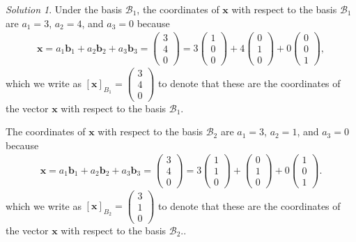 \documentclass[
]{book}
\theoremstyle{definition}
\theoremstyle{definition}
\theoremstyle{definition}
\theoremstyle{definition}
\theoremstyle{remark}
\newtheorem*{solution}{Solution}
\begin{document}
\begin{solution}

Under the basis \(\mathcal{B}_1\), the coordinates of \(\mathbf{x}\) with respect to the basis \(\mathcal{B}_1\) are \(a_1 = 3\), \(a_2 = 4\), and \(a_3 = 0\) because
\[
\begin{aligned}
\mathbf{x} = a_1 \mathbf{b}_1 + a_2 \mathbf{b}_2 + a_3 \mathbf{b}_3 =  \begin{pmatrix} 3 \\ 4 \\ 0 \end{pmatrix} = 3 \begin{pmatrix} 1 \\ 0 \\ 0 \end{pmatrix} + 4 \begin{pmatrix} 0 \\ 1 \\ 0 \end{pmatrix} + 0 \begin{pmatrix} 0 \\ 0 \\ 1 \end{pmatrix},
\end{aligned}
\]
which we write as \(\left[\mathbf{x}\right]_{B_1} = \begin{pmatrix} 3 \\ 4 \\ 0 \end{pmatrix}\) to denote that these are the coordinates of the vector \(\mathbf{x}\) with respect to the basis \(\mathcal{B}_1\).

The coordinates of \(\mathbf{x}\) with respect to the basis \(\mathcal{B}_2\) are \(a_1 = 3\), \(a_2 = 1\), and \(a_3 = 0\) because
\[
\begin{aligned}
\mathbf{x} = a_1 \mathbf{b}_1 + a_2 \mathbf{b}_2 + a_3 \mathbf{b}_3 = \begin{pmatrix} 3 \\ 4 \\ 0 \end{pmatrix} = 3 \begin{pmatrix} 1 \\ 1 \\ 0 \end{pmatrix} + \begin{pmatrix} 0 \\ 1 \\ 0 \end{pmatrix} + 0 \begin{pmatrix} 1 \\ 0 \\ 1 \end{pmatrix}.
\end{aligned}
\]
which we write as \(\left[\mathbf{x}\right]_{B_2} = \begin{pmatrix} 3 \\ 1 \\ 0 \end{pmatrix}\) to denote that these are the coordinates of the vector \(\mathbf{x}\) with respect to the basis \(\mathcal{B}_2\)..


\end{solution}
\end{document}
